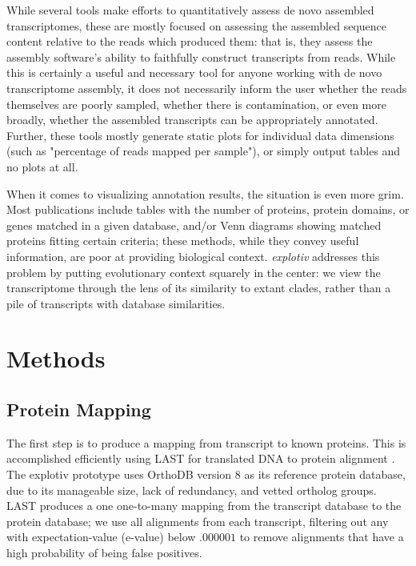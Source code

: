 \documentclass[12pt]{article} %
\begin{document}
While several tools make efforts to quantitatively assess de novo assembled transcriptomes, these are mostly focused on assessing
the assembled sequence content relative to the reads which produced them: that is, they assess the assembly software's ability
to faithfully construct transcripts from reads. While this is certainly a useful and necessary tool for anyone working with de novo
transcriptome assembly, it does not necessarily inform the user whether the reads themselves are poorly sampled, whether
there is contamination, or even more broadly, whether the assembled transcripts can be appropriately annotated. Further,
these tools mostly generate static plots for individual data dimensions (such as "percentage of reads mapped per sample"), or
simply output tables and no plots at all. 

When it comes to visualizing annotation results, the situation is even more grim. Most publications include tables with the number
of proteins, protein domains, or genes matched in a given database, and/or Venn diagrams showing matched proteins fitting certain
criteria; these methods, while they convey useful information, are poor at providing biological context. \textit{explotiv} addresses
this problem by putting evolutionary context squarely in the center: we view the transcriptome through the lens of its similarity
to extant clades, rather than a pile of transcripts with database similarities.

\section{Methods}

\subsection{Protein Mapping}

The first step is to produce a mapping from transcript to known proteins. This is accomplished efficiently using LAST 
for translated DNA to protein alignment \cite{kielbasa_adaptive_2011} \cite{sheetlin_frameshift_2014}. The
explotiv prototype uses OrthoDB version 8 \cite{waterhouse_orthodb:_2011} as its reference protein database, due
to its manageable size, lack of redundancy, and vetted ortholog groups. LAST produces a one one-to-many mapping
from the transcript database to the protein database; we use all alignments from each transcript, filtering out any
with expectation-value (e-value) below $.000001$ to remove alignments that have a high probability of being
false positives.
\end{document}
